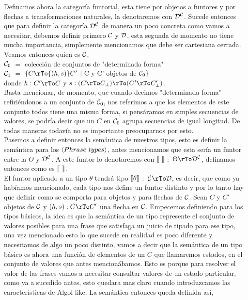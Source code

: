 Definamos ahora la categor\'ia funtorial, esta tiene por objetos a funtores y 
por flechas a transformaciones naturales, la denotaremos con ${\mathcal{D}}^{\mathcal{C}}$. Sucede entonces
que para definir la categor\'ia ${\mathcal{D}}^{\mathcal{C}}$ de manera un poco concreta como vamos a 
necesitar, debemos definir primero $\mathcal{C}$ y $\mathcal{D}$, esta segunda de momento no tiene
mucha importancia, simplemente mencionamos que debe ser cartesiana cerrada. 
Veamos entonces quien es $\mathcal{C}$, \\

\noindent
$\mathcal{C}_0$ $=$ colecci\'on de conjuntos de "determinada forma"\\
$\mathcal{C}_1$ $=$ $\{C \rTo{(h,s)} C' $ $|$  C y C' objetos de $\mathcal{C}_0 \}$ \\
donde $h : C' \rTo C$ y $s : (C \rTo C_\bot) \rTo (C' \rTo C'_\bot)$.\\

Basta mencionar, de momento, que cuando decimos "determinada forma" 
refiri\'endonos a un conjunto de $\mathcal{C}_0$, nos referimos a que los
elementos de este conjunto todos tiene una misma forma, si pens\'aramos
en simples secuencias de valores, se podr\'ia decir que un $C$ en $\mathcal{C}_0$
agrupa secuencias de igual longitud. De todas maneras todav\'ia no
es importante preocuparnos por esto.\\

Pasemos a definir entonces la sem\'antica de nuestros tipos, esto es
definir la sem\'antica para los $\langle Phrase \ types \rangle$, antes
mencionamos que esta ser\'ia un funtor entre la $\Theta$ y ${\mathcal{D}}^{\mathcal{C}}$.
A este funtor lo denotaremos con $\llbracket  \  \rrbracket$ $:$ $\Theta \rTo \DC$,
definamos entonces como es $\llbracket  \  \rrbracket$. \\
El funtor aplicado a un tipo $\theta$ tendr\'a tipo
$\llbracket  \theta  \rrbracket$ $:$ $\C \rTo \D$, es decir, que como ya
hab\'iamos mencionado, cada tipo nos define un funtor distinto y 
por lo tanto hay que definir como se comporta para objetos y para 
flechas de $\mathcal{C}$. Sean $C$ y $C'$ objetos de $\mathcal{C}$ y $(h,s) : C \rTo C'$ 
una flecha en $\mathcal{C}$. Empecemos definiendo para los tipos b\'asicos, la
idea es que la sem\'antica de un tipo represente el conjunto de valores
posibles para una frase que satisfaga un juicio de tipado para ese tipo,
una vez mencionado esto lo que sucede en realidad es poco diferente y 
necesitamos de algo un poco distinto, vamos a decir que la sem\'antica
de un tipo b\'asico es ahora una funci\'on de elementos de un $C$ que llamaremos
estados, en el conjunto de valores que antes mencion\'abamos. Esto es porque para
resolver el valor de las frases vamos a necesitar consultar valores de un estado
particular, como ya a sucedido antes, esto quedara mas claro cuando 
introduzcamos las caracter\'isticas de Algol-like. La sem\'antica 
entonces queda definida as\'i,\\


